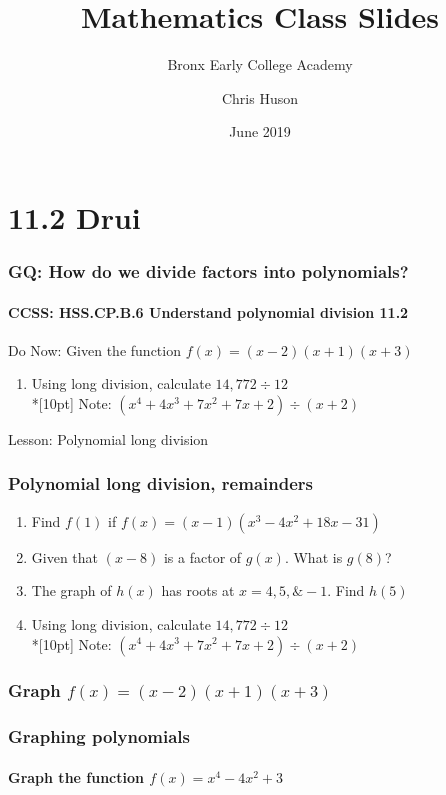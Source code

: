 \documentclass{beamer}
\title{Mathematics Class Slides}
\subtitle{Bronx Early College Academy}
\author{Chris Huson}
\date{June 2019}
\begin{document}
\frame{\titlepage}


\section{11.2 Drui}
\frame
{
  \frametitle{GQ: How do we divide factors into polynomials?}
  \framesubtitle{CCSS: HSS.CP.B.6 Understand polynomial division \qquad \qquad \qquad \alert{11.2}}

  \begin{block}{Do Now: Given the function $f(x)=(x-2)(x+1)(x+3)$}
    \begin{enumerate}
    \item Using long division, calculate $14,772 \div 12$\\*[10pt]
    Note: $(x^4+4x^3+7x^2+7x+2) \div (x+2)$
    \end{enumerate}
  \end{block}
  Lesson: Polynomial long division %
}

\frame
{
  \frametitle{Polynomial long division, remainders }
\begin{enumerate}
    \item Find $f(1)$ if $f(x)=(x-1)(x^3-4x^2+18x-31)$
    \item Given that $(x-8)$ is a factor of $g(x)$. What is $g(8)$?
    \item The graph of $h(x)$ has roots at $x=4, 5, \& -1$. Find $h(5)$
    \item Using long division, calculate $14,772 \div 12$\\*[10pt]
    Note: $(x^4+4x^3+7x^2+7x+2) \div (x+2)$
\end{enumerate}

}

\frame
{
  \frametitle{Graph $f(x)=(x-2)(x+1)(x+3)$}

}

\frame
{
  \frametitle{Graphing polynomials}
  \framesubtitle{Graph the function $f(x)=x^4-4x^2+3$}

}
\end{document}

